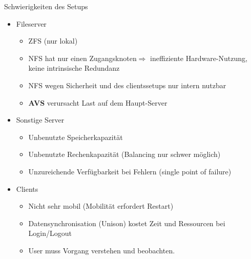 \documentclass[hyperref={xetex}]{beamer}
\begin{document}
\begin{frame}{Schwierigkeiten des Setups}

	\begin{itemize}
		\item Fileserver
			\begin{itemize}
				\item ZFS  (nur lokal)
				\item NFS hat nur einen Zugangsknoten$\Rightarrow$ ineffiziente Hardware-Nutzung, keine intrinsische Redundanz
                \item NFS wegen Sicherheit und des clientssetups nur intern nutzbar
                \item \textbf{AVS} verursacht Last auf dem Haupt-Server
            \end{itemize} 
		\item <2-3> Sonstige Server
			\begin{itemize}
				\item Unbenutzte Speicherkapazit\"at
				\item Unbenutzte Rechenkapazit\"at (Balancing nur schwer möglich)
				\item Unzureichende Verf\"ugbarkeit bei Fehlern (single point of failure)
			\end{itemize}
        \item <3> Clients
             \begin{itemize}
                 \item Nicht sehr mobil (Mobilität erfordert Restart)
                 \item Datensynchronisation (Unison) kostet Zeit und Ressourcen bei Login/Logout
                 \item User muss Vorgang verstehen und beobachten.
			\end{itemize}
	\end{itemize}
\end{frame}
\end{document}
